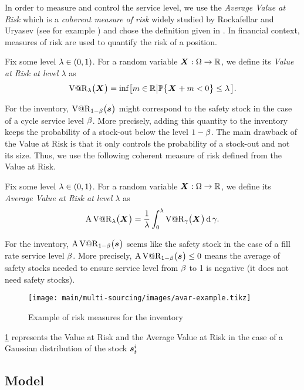In order to measure and control the service level, we use the \emph{Average Value at Risk} which is a \emph{coherent measure of risk} widely studied by Rockafellar and Uryasev (see for example \cite{Rockafellar2000,Rockafellar2002}) and chose the definition given in \cite{Follmer2004}.
In financial context, measures of risk are used to quantify the risk of a position.


\begin{defn}
Fix some level $\lambda\in\bracket{0,1}$. For a random variable $\va X:\scenarios\to\RR$, we define its \emph{Value at Risk at level $\lambda$} as
$$\VaR_{\lambda}\bracket{\va X} = \inf\sqbracket{m\in\RR\left|\prob\crbracket{\va X+m<0}\le\lambda\right.}.$$
\end{defn}
For the inventory, $\VaR_{1-\servicelvl}\bracket{\va\inventory}$ might correspond to the safety stock in the case of a cycle service level $\beta$.
More precisely, adding this quantity to the inventory keeps the probability of a stock-out below the level $1-\beta$.
The main drawback of the Value at Risk is that it only controls the probability of a stock-out and not its size.
Thus, we use the following coherent measure of risk defined from the Value at Risk.


\begin{defn}
Fix some level $\lambda\in\bracket{0,1}$. For a random variable $\va X:\scenarios\to\RR$, we define its \emph{Average Value at Risk at level $\lambda$} as
$$\AVaR_{\lambda}\bracket{\va X} = \frac{1}{\lambda}\int_0^{\lambda}\VaR_{\gamma}\bracket{\va X}\diff\gamma.$$
\end{defn}
For the inventory, $\AVaR_{1-\servicelvl}\bracket{\va\inventory}$ seems like the safety stock in the case of a fill rate service level $\beta$.
More precisely, $\AVaR_{1-\servicelvl}\bracket{\va\inventory}\le 0$ means the average of safety stocks needed to ensure service level from $\beta$ to 1 is negative (\ie it does not need safety stocks).


\begin{figure}[h]
  \centering
  \texttt{[image: main/multi-sourcing/images/avar-example.tikz]}
  \caption{Example of risk measures for the inventory}
  \label{fig:avar-examples}
\end{figure}


\cref{fig:avar-examples} represents the Value at Risk and the Average Value at Risk in the case of a Gaussian distribution of the stock $\va\inventory_t^i$


\subsection{Model}


